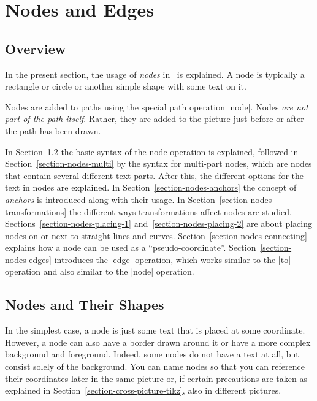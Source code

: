 %
%
%


\section[tikz-shapes]{Nodes and Edges}
\label{section-nodes}

\subsection{Overview}

In the present section, the usage of \emph{nodes} in \tikzname\ is explained. A
node is typically a rectangle or circle or another simple shape with some text
on it.

Nodes are added to paths using the special path operation |node|. Nodes
\emph{are not part of the path itself}. Rather, they are added to the picture
just before or after the path has been drawn.

In Section~\ref{section-nodes-basic} the basic syntax of the node operation is
explained, followed in Section~\ref{section-nodes-multi} by the syntax for
multi-part nodes, which are nodes that contain several different text parts.
After this, the different options for the text in nodes are explained. In
Section~\ref{section-nodes-anchors} the concept of \emph{anchors} is introduced
along with their usage. In Section~\ref{section-nodes-transformations} the
different ways transformations affect nodes are studied.
Sections~\ref{section-nodes-placing-1} and~\ref{section-nodes-placing-2} are
about placing nodes on or next to straight lines and curves.
Section~\ref{section-nodes-connecting} explains how a node can be used as a
``pseudo-coordinate''. Section~\ref{section-nodes-edges} introduces the |edge|
operation, which works similar to the |to| operation and also similar to the
|node| operation.


\subsection{Nodes and Their Shapes}
\label{section-nodes-basic}

In the simplest case, a node is just some text that is placed at some
coordinate. However, a node can also have a border drawn around it or have a
more complex background and foreground. Indeed, some nodes do not have a text
at all, but consist solely of the background. You can name nodes so that you
can reference their coordinates later in the same picture or, if certain
precautions are taken as explained in Section~\ref{section-cross-picture-tikz},
also in different pictures.

